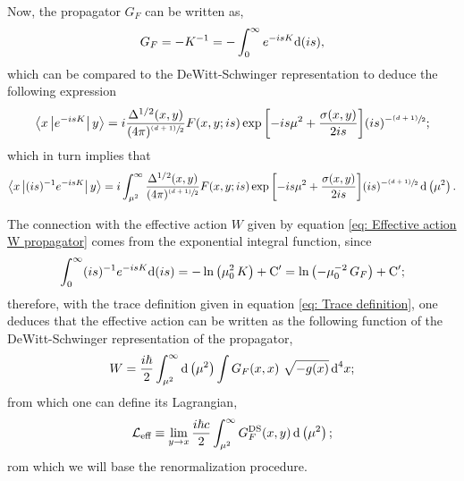Now, the propagator $G_F$ can be written as,
\begin{equation}
	G_F=-K^{-1}=-\int_0^\infty e^{-is K}\text{d} (is),
\end{equation}
which can be compared to the DeWitt-Schwinger representation to deduce the following expression
\begin{equation}
\left\langle x\left|e^{-isK}\right|y\right\rangle=i\frac{\Delta^{1/2}(x,y)}{(4\pi)^{\sfrac{(d+1)}{2}}}F(x,y;is)\exp{\left[-is\mu^2+\frac{\sigma(x,y)}{2is}\right]}(is)^{-\sfrac{(d+1)}{2}};
\end{equation}
which in turn implies that
\begin{equation}
	\left\langle x\left|(is)^{-1}e^{-isK}\right|y\right\rangle=i\int_{\mu^2}^\infty\frac{\Delta^{1/2}(x,y)}{(4\pi)^{\sfrac{(d+1)}{2}}}F(x,y;is)\exp{\left[-is\mu^2+\frac{\sigma(x,y)}{2is}\right]}(is)^{-\sfrac{(d+1)}{2}}\,\text{d} \left(\mu^2\right).
\end{equation}

The connection with the effective action $W$ given by equation \ref{eq: Effective action W propagator} comes from the exponential integral function, since
\begin{equation}
	\int_0^\infty(is)^{-1}e^{-is K}\text{d}(is)=-\ln\left(\mu_0^2\,K\right)+\text{C}'=\ln\left(-\mu^{-2}_0\,G_F\right)+\text{C}';
\end{equation}
therefore, with the trace definition given in equation \ref{eq: Trace definition}, one deduces that the effective action can be written as the following function of the DeWitt-Schwinger representation of the propagator,
\begin{equation}
	W=\frac{i\hbar}{2}  \int_{\mu^2}^\infty \text{d} \left(\mu^2\right)\int G_F(x,x)\,\,\sqrt{-g(x)}\,\text{d}^4x;
\end{equation}
from which one can define its Lagrangian,
\begin{equation}
	\mathcal{L}_{\text{eff}}\equiv \lim\limits_{y\to x}\frac{i\hbar c}{2}\int_{\mu^2}^\infty G_F^{\text{DS}}(x,y)\,\text{d}\left(\mu^2\right);
\end{equation}
rom which we will base the renormalization procedure.



